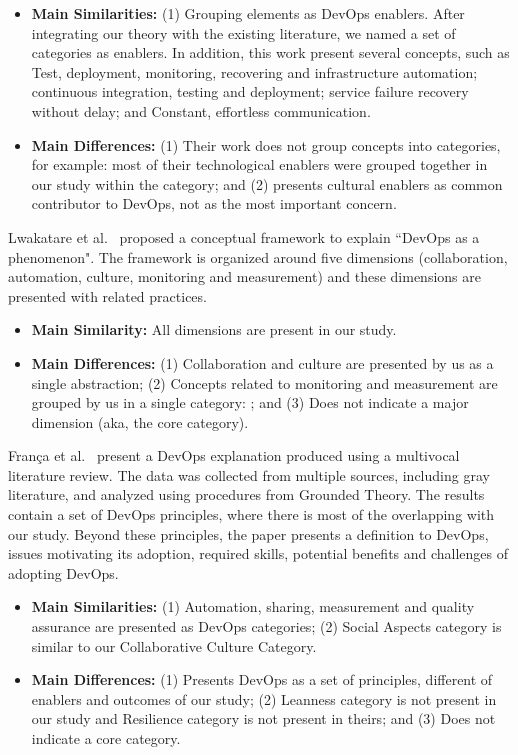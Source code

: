 \begin{itemize}
\item \textbf{Main Similarities:}
  (1) Grouping elements as DevOps enablers. After integrating our theory with the 
existing literature, we named a set of categories as enablers. In addition, this 
work present several concepts, such as Test, deployment, monitoring, recovering 
and infrastructure automation; continuous integration, testing and deployment;
service failure recovery without delay; and Constant, effortless communication.

\item \textbf{Main Differences:}
(1) Their work does not group concepts into categories, for example: most of their technological enablers
were grouped together in our study within the   category; and (2) presents
cultural enablers as common contributor to DevOps, not as the 
most important concern.
\end{itemize}

Lwakatare et al.~\cite{extending_dimensions_icsea_16} proposed a conceptual
framework to explain ``DevOps as a phenomenon". The framework is organized around
five dimensions (collaboration, automation, culture, monitoring and measurement)
and these dimensions are presented with related practices.
\begin{itemize}
\item \textbf{Main Similarity:}
  All dimensions are present in our study.

\item \textbf{Main Differences:}
  (1) Collaboration and culture are presented by us as a single abstraction;
  (2) Concepts related to monitoring and measurement are grouped by us in a single
  category: ; and (3) Does not indicate a major dimension (aka, 
  the core category). 
\end{itemize}

Fran\c{c}a et al.~\cite{characterizing_devops_sbes_2016} present a DevOps
explanation produced using a multivocal literature review. The data was collected
from multiple sources, including gray literature, and analyzed using procedures
from Grounded Theory. The results contain a set of DevOps principles, where
there is most of the overlapping with our study. Beyond these principles, the paper
presents a definition to DevOps, issues motivating its adoption, required skills,
potential benefits and challenges of adopting DevOps.

\begin{itemize}
\item \textbf{Main Similarities:}
  (1) Automation, sharing, measurement and quality assurance are presented as DevOps categories;
  (2) Social Aspects category is similar to our Collaborative Culture Category.

\item \textbf{Main Differences:}
  (1) Presents DevOps as a set of principles, different of enablers and outcomes of
  our study;
  (2) Leanness category is not present in our study and Resilience category is not
  present in theirs; and (3) Does not indicate a core category.

\end{itemize}

